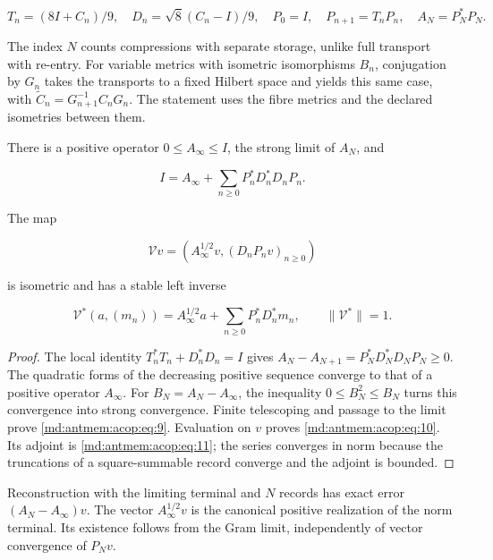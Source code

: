 \[
T_n=(8I+C_n)/9,\quad D_n=\sqrt8(C_n-I)/9,
\quad P_0=I,\quad P_{n+1}=T_nP_n,\quad A_N=P_N^*P_N.
\]

The index \(N\) counts compressions with separate storage, unlike full transport with re-entry. For variable metrics with isometric isomorphisms \(B_n\), conjugation by \(G_n\) takes the transports to a fixed Hilbert space and yields this same case, with \(\widetilde C_n=G_{n+1}^{-1}C_nG_n\). The statement uses the fibre metrics and the declared isometries between them.

\begin{theorem}
\label{md:antmem:terminal-no-estacionario}
There is a positive operator \(0\leq A_\infty\leq I\), the strong limit of \(A_N\), and

\begin{equation}
\boxed{I=A_\infty+\sum_{n\ge0}P_n^*D_n^*D_nP_n.}
\label{md:antmem:acop:eq:9}
\end{equation}

The map

\begin{equation}
\boxed{\mathcal Vv=(A_\infty^{1/2}v,(D_nP_nv)_{n\ge0})}
\label{md:antmem:acop:eq:10}
\end{equation}

is isometric and has a stable left inverse

\begin{equation}
\mathcal V^*(a,(m_n))=A_\infty^{1/2}a+
\sum_{n\ge0}P_n^*D_n^*m_n,\qquad\|\mathcal V^*\|=1.
\label{md:antmem:acop:eq:11}
\end{equation}

\end{theorem}
\begin{proof}
The local identity \(T_n^*T_n+D_n^*D_n=I\) gives
\(A_N-A_{N+1}=P_N^*D_N^*D_NP_N\geq0\). The quadratic forms of
the decreasing positive sequence converge to that of a positive operator
\(A_\infty\). For \(B_N=A_N-A_\infty\), the inequality
\(0\leq B_N^2\leq B_N\) turns this convergence into strong convergence.
Finite telescoping and passage to the limit prove \eqref{md:antmem:acop:eq:9}. Evaluation on \(v\)
proves \eqref{md:antmem:acop:eq:10}. Its adjoint is \eqref{md:antmem:acop:eq:11}; the series converges in norm because
the truncations of a square-summable record converge and the adjoint is bounded.
\end{proof}

Reconstruction with the limiting terminal and \(N\) records has exact
error \((A_N-A_\infty)v\). The vector \(A_\infty^{1/2}v\) is the
canonical positive realization of the norm terminal. Its existence follows
from the Gram limit, independently of vector convergence of \(P_Nv\).

